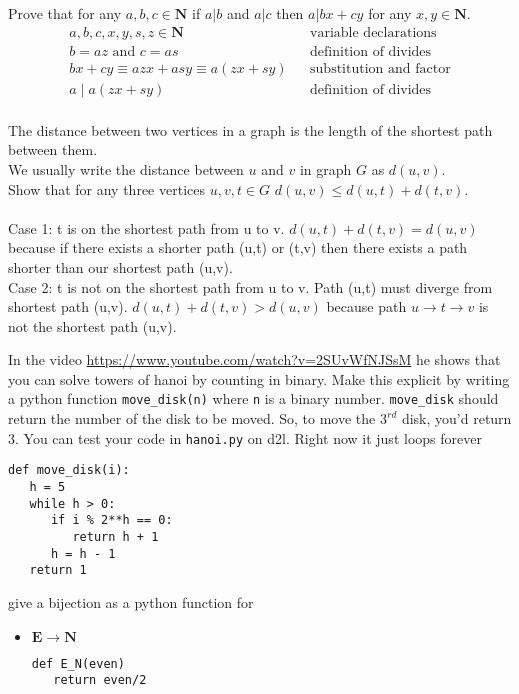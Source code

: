 \documentclass{exam}
\newcommand\N{\mathbf{N}}
\newcommand\E{\mathbf{E}}
\begin{document}
\begin{questions}
\question
Prove that for any $a,b,c\in \N$ if $a | b$ and $a | c$ then $a | bx + cy$ for any $x,y\in \N$.
\begin{align*}
   a, b, c, x, y, s, z \in \N && \text{variable declarations} \\
   b = az \text{ and } c = as && \text{definition of divides} \\
   bx + cy \equiv azx + asy \equiv a(zx + sy) && \text{substitution and factor} \\
   a \mid a(zx + sy) && \text{definition of divides} \\
\end{align*}

\question
The distance between two vertices in a graph is the length of the shortest path between them.\\
We usually write the distance between $u$ and $v$ in graph $G$ as $d(u,v)$.\\
Show that for any three vertices $u,v,t \in G$ $d(u,v) \le d(u,t) + d(t,v)$. \\
\\
Case 1: t is on the shortest path from u to v. $d(u,t) + d(t,v) = d(u,v)$ because if there exists a shorter path (u,t) or (t,v) then there exists a path shorter than our shortest path (u,v).
\\
Case 2: t is not on the shortest path from u to v. Path (u,t) must diverge from shortest path (u,v). $d(u,t) + d(t,v) > d(u,v)$ because path $u \to t \to v$ is not the shortest path (u,v).

\question
In the video \url{https://www.youtube.com/watch?v=2SUvWfNJSsM}
he shows that you can solve towers of hanoi by counting in binary.
Make this explicit by writing a python function \texttt{move\_disk(n)} where \texttt n
is a binary number.
\texttt{move\_disk} should return the number of the disk to be moved.
So, to move the $3^{rd}$ disk, you'd return 3.
You can test your code in \texttt{hanoi.py} on d2l.
Right now it just loops forever

\begin{lstlisting}
def move_disk(i):
   h = 5
   while h > 0:
      if i % 2**h == 0:
         return h + 1
      h = h - 1
   return 1
\end{lstlisting}

\question
give a bijection as a python function for
\begin{itemize}
    \item $\E \to \N$

\begin{lstlisting}
def E_N(even)
   return even/2
\end{lstlisting}


\end{itemize}
\end{questions}
\end{document}
